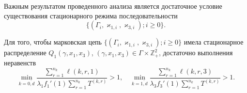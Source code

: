 Важным результатом проведенного анализа является достаточное условие существования стационарного режима последовательности $$\{(\Gamma_i,  \varkappa_{1, i}, \varkappa_{3, i}); i \geqslant 0\}.$$
\begin{theorem}
Для того,  чтобы марковская цепь $\{(\Gamma_i,  \varkappa_{1, i}, \varkappa_{3, i}); i \geqslant 0\}$ имела стационарное распределение $Q_1(\gamma, x_1, x_3)$,  $(\gamma, x_1, x_3)\in \Gamma \times {\mathbb Z}^2_+$,  достаточно выполнения неравенств
\begin{equation}
\min_{k=\overline{0, d}} { \frac{\sum_{r = 1}^{n_k} \ell(k, r, 1) }{\lambda_1 f_1'(1) \sum_{r=1}^{n_k} T^{(k, r)} }}>1,  \quad 
\min_{k=\overline{1, d}} { \frac{\sum_{r = 1}^{n_k} \ell(k, r, 3) }{\lambda_3 f_3'(1) \sum_{r=1}^{n_k} T^{(k, r)} }}>1.
\label{sufficient:double}
\end{equation}
\label{sufficient:double:theorem}
\end{theorem}

